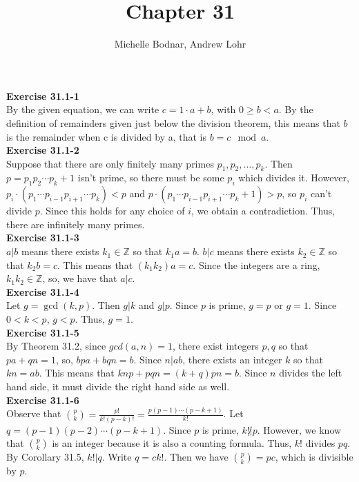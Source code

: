 \documentclass{article}
\title{Chapter 31}
\author{Michelle Bodnar, Andrew Lohr}
\newcommand{\Z}{\mathbb{Z}}
\begin{document}
\maketitle
\noindent\textbf{Exercise 31.1-1}\\

By the given equation, we can write $c = 1\cdot a + b$, with $0\ge b <a$. By the definition of remainders given just below the division theorem, this means that $b$ is the remainder when c is divided by a, that is $b=  c\mod a$.\\

\noindent\textbf{Exercise 31.1-2}\\

Suppose that there are only finitely many primes $p_1, p_2, \ldots, p_k$.  Then $p = p_1p_2 \cdots p_k + 1$ isn't prime, so there must be some $p_i$ which divides it.  However, $p_i\cdot(p_1\cdots p_{i-1}p_{i+1} \cdots p_k) < p$ and $p \cdot (p_1\cdots p_{i-1}p_{i+1} \cdots p_k + 1) > p$, so $p_i$ can't divide $p$.  Since this holds for any choice of $i$, we obtain a contradiction.  Thus, there are infinitely many primes. \\


\noindent\textbf{Exercise 31.1-3}\\

$a | b$ means there exists $k_1\in \Z$ so that $k_1 a = b$. $b|c$ means there exists $k_2\in \Z$ so that $k_2 b = c$. This means that $(k_1 k_2) a = c$. Since the integers are a ring, $k_1 k_2 \in \Z$, so, we have that $a | c$.\\

\noindent\textbf{Exercise 31.1-4}\\

Let $g = \gcd(k,p)$. Then $g|k$ and $g|p$.  Since $p$ is prime, $g=p$ or $g=1$.  Since $0 < k < p$, $g < p$. Thus, $g = 1$. \\

\noindent\textbf{Exercise 31.1-5}\\

By Theorem 31.2, since $gcd(a,n) =1$, there exist integers $p,q$ so that $pa +qn = 1$, so, $bpa+bqn=b$. Since $n | ab$, there exists an integer $k$ so that $kn = ab$. This means that $knp + pqn =(k +q)pn= b$. Since $n$ divides the left hand side, it must divide the right hand side as well.\\

\noindent\textbf{Exercise 31.1-6}\\

Observe that ${p \choose k} = \frac{p!}{k!(p-k)!} = \frac{p(p-1)\cdots(p-k+1)}{k!}$.  Let $q = (p-1)(p-2)\cdots(p-k+1)$.  Since $p$ is prime, $k! \not| p$.  However, we know that ${p \choose k}$ is an integer because it is also a counting formula. Thus, $k!$ divides $pq$.  By Corollary 31.5, $k! | q$.  Write $q = ck!$. Then we have ${p \choose k} = p c$, which is divisible by $p$.  
\end{document}
